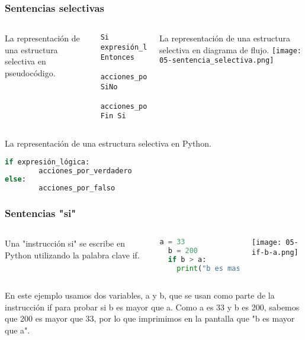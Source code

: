 \begin{frame}[fragile]
  \frametitle{Sentencias selectivas}

  \begin{columns}
    La representación de una estructura selectiva en pseudocódigo.
    \vspace{\baselineskip}
    \begin{lstlisting}[style=pseudocodigo]
Si expresión_lógica Entonces
		acciones_por_verdadero
SiNo
		acciones_por_falso
Fin Si\end{lstlisting}

    \pausa
    La representación de una estructura selectiva en diagrama de flujo.
    \texttt{[image: 05-sentencia\_selectiva.png]}
  \end{columns}

  \pausa
  \vspace{\baselineskip}
  La representación de una estructura selectiva en Python.
  \begin{lstlisting}[language=Python]
if expresión_lógica:
		acciones_por_verdadero
else:
		acciones_por_falso
  \end{lstlisting}
\end{frame}

\begin{frame}[fragile]
  \frametitle{Sentencias "si"}

  \begin{columns}
      Una "instrucción si" se escribe en Python utilizando la palabra clave
      \textcolor{codeKeyword}{if}.

      \vspace{\baselineskip}
      \begin{lstlisting}[language=Python]
  a = 33
  b = 200
  if b > a:
    print("b es mas grande que a")\end{lstlisting}

    \texttt{[image: 05-if-b-a.png]}
  \end{columns}
  En este ejemplo usamos dos variables, a y b, que se usan como parte de
  la instrucción \textcolor{codeKeyword}{if} para probar si b es mayor
  que a. Como a es 33 y b es 200, sabemos que 200 es mayor que 33,
  por lo que imprimimos en la pantalla que "b es mayor que a".
\end{frame}

